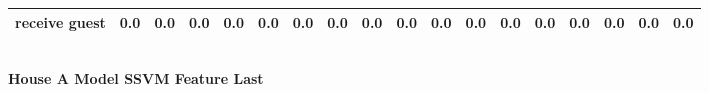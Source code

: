 \documentclass{article}
\begin{document}
\begin{sideways}
\begin{tabular}{lrrrrrrrrrrrrrrrrr}
receive guest                 &         0.0 &                0.0 &           0.0 &               0.0 &                0.0 &                0.0 &              0.0 &                      0.0 &                   0.0 &              0.0 &              0.0 &                            0.0 &                      0.0 &                    0.0 &                                  0.0 &                          0.0 &                  0.0 \\
\bottomrule
\end{tabular}
\end{sideways}
\normalsize
\vspace{1cm}\\
\textbf{House A Model SSVM Feature Last}\\
\vspace{1cm}\\
\end{document}
